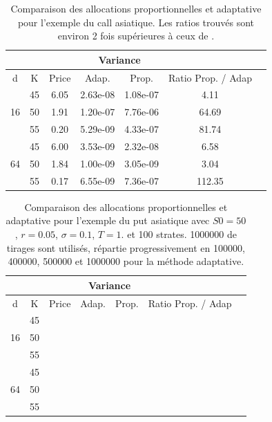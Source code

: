 \documentclass[12pt,a4paper]{report}
\begin{document}
\begin{table}[H]
\centering
	\begin{tabular*}{\textwidth}{@{\extracolsep{\fill}}ccccccc}
		\hline
			                &   &   & \multicolumn{2}{|c|}{Variance} &                      \\ 
		\hline
		
		d	                & K  & Price  & Adap.    & Prop.    & Ratio Prop. / Adap        \\
		\hline
		\multirow{3}{*}{16} & 45 & 6.05   & 2.63e-08 & 1.08e-07 & 4.11	                    \\
							& 50 & 1.91   & 1.20e-07 & 7.76e-06 & 64.69	                    \\
							& 55 & 0.20   & 5.29e-09 & 4.33e-07 & 81.74	                    \\
	 \hline
		\multirow{3}{*}{64} & 45 & 6.00   & 3.53e-09 & 2.32e-08 & 6.58	                    \\
							& 50 & 1.84   & 1.00e-09 & 3.05e-09 & 3.04                      \\
							& 55 & 0.17   & 6.55e-09 & 7.36e-07 & 112.35	                \\
		\hline
	\end{tabular*}
\caption{Comparaison des allocations proportionnelles et adaptative pour l'exemple du call asiatique. Les ratios trouvés sont environ 2 fois supérieures à ceux de \cite{EJ08}.}
\label{tab:strat_asian_call}
\end{table}

\begin{table}[H]
\centering
	\begin{tabular*}{\textwidth}{@{\extracolsep{\fill}}ccccccc}
		\hline
			                &   &   & \multicolumn{2}{|c|}{Variance} &                      \\ 
		\hline
		
		d	                & K  & Price  & Adap.    & Prop.    & Ratio Prop. / Adap        \\
		\hline
		\multirow{3}{*}{16} & 45 &    &  &  & 	                    \\
							& 50 &    &  &  & 	                    \\
							& 55 &    &  &  & 	                    \\
		\hline
		\multirow{3}{*}{64} & 45 &    &  &  & 	                    \\
							& 50 &    &  &  &                       \\
							& 55 &    &  &  & 	                \\
		\hline
	\end{tabular*}
\caption{Comparaison des allocations proportionnelles et adaptative pour l'exemple du put asiatique avec $S0 = 50$, $r = 0.05$, $\sigma = 0.1$, $T = 1.$ et 100 strates. 1000000 de tirages sont utilisés, répartie progressivement en 100000, 400000, 500000 et 1000000 pour la méthode adaptative.}
\label{tab:strat_asian_put}
\end{table}
\end{document}
